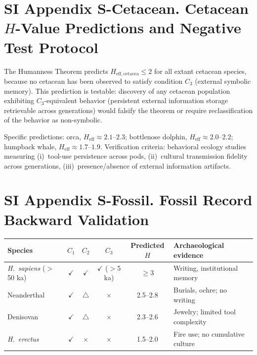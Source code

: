 \documentclass[11pt]{article}
\begin{document}

\section*{SI Appendix S-Cetacean. Cetacean $H$-Value Predictions and Negative Test Protocol}

The Humanness Theorem predicts $H_{\mathrm{eff,cetacea}} \le 2$ for all extant cetacean species, because no cetacean has been observed to satisfy condition $C_3$ (external symbolic memory).
This prediction is testable: discovery of any cetacean population exhibiting $C_3$-equivalent behavior (persistent external information storage retrievable across generations) would falsify the theorem or require reclassification of the behavior as non-symbolic.

Specific predictions: orca, $H_{\mathrm{eff}} \approx 2.1$--$2.3$; bottlenose dolphin, $H_{\mathrm{eff}} \approx 2.0$--$2.2$; humpback whale, $H_{\mathrm{eff}} \approx 1.7$--$1.9$.
Verification criteria: behavioral ecology studies measuring (i)~tool-use persistence across pods, (ii)~cultural transmission fidelity across generations, (iii)~presence/absence of external information artifacts.


\section*{SI Appendix S-Fossil. Fossil Record Backward Validation}

\begin{center}
\begin{tabular}{lccccl}
\toprule
Species & $C_1$ & $C_2$ & $C_3$ & Predicted $H$ & Archaeological evidence \\
\midrule
\textit{H.~sapiens} ($>$50 ka) & $\checkmark$ & $\checkmark$ & $\checkmark$ ($>$5 ka) & $\ge 3$ & Writing, institutional memory \\
Neanderthal & $\checkmark$ & $\triangle$ & $\times$ & 2.5--2.8 & Burials, ochre; no writing \\
Denisovan & $\checkmark$ & $\triangle$ & $\times$ & 2.3--2.6 & Jewelry; limited tool complexity \\
\textit{H.~erectus} & $\checkmark$ & $\times$ & $\times$ & 1.5--2.0 & Fire use; no cumulative culture \\
\bottomrule
\end{tabular}
\end{center}
\end{document}
